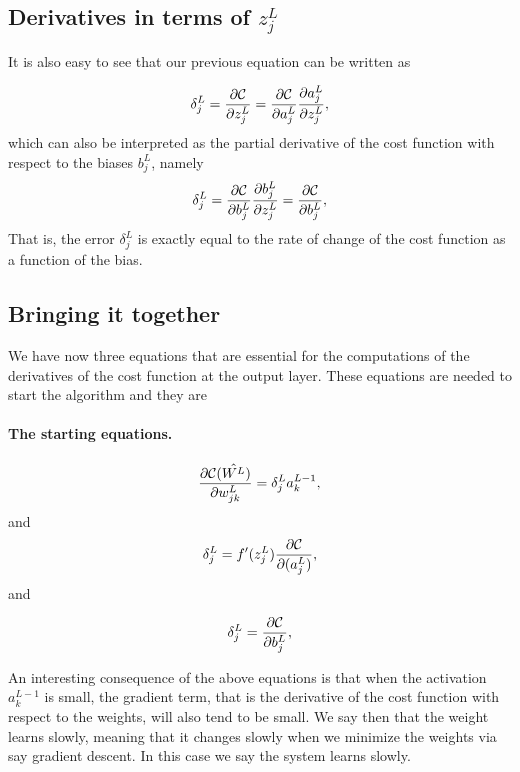 \documentclass[%
oneside,                 %
final,                   %
10pt]{article}
\begin{document}
\subsection*{Derivatives in terms of $z_j^L$}

It is also easy to see that our previous equation can be written as

\[
\delta_j^L =\frac{\partial {\cal C}}{\partial z_j^L}= \frac{\partial {\cal C}}{\partial a_j^L}\frac{\partial a_j^L}{\partial z_j^L},
\]
which can also be interpreted as the partial derivative of the cost function with respect to the biases $b_j^L$, namely
\[
\delta_j^L = \frac{\partial {\cal C}}{\partial b_j^L}\frac{\partial b_j^L}{\partial z_j^L}=\frac{\partial {\cal C}}{\partial b_j^L},
\]
That is, the error $\delta_j^L$ is exactly equal to the rate of change of the cost function as a function of the bias. 
\subsection*{Bringing it together}

We have now three equations that are essential for the computations of the derivatives of the cost function at the output layer. These equations are needed to start the algorithm and they are


\paragraph{The starting equations.}

\begin{equation}
\frac{\partial{\cal C}(\hat{W^L})}{\partial w_{jk}^L}  =  \delta_j^La_k^{L-1},
\end{equation}
and
\begin{equation}
\delta_j^L = f'(z_j^L)\frac{\partial {\cal C}}{\partial (a_j^L)},
\end{equation}
and

\begin{equation}
\delta_j^L = \frac{\partial {\cal C}}{\partial b_j^L},
\end{equation}




An interesting consequence of the above equations is that when the
activation $a_k^{L-1}$ is small, the gradient term, that is the
derivative of the cost function with respect to the weights, will also
tend to be small. We say then that the weight learns slowly, meaning
that it changes slowly when we minimize the weights via say gradient
descent. In this case we say the system learns slowly.
\end{document}
